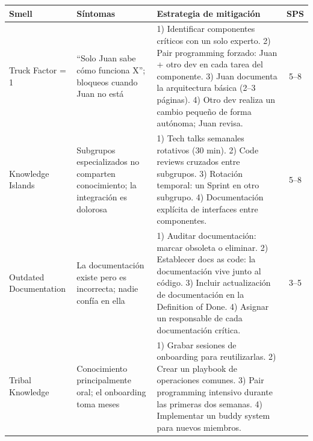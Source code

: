 \begin{table}[h]
    \centering
    \footnotesize
    \begin{tabularx}{\textwidth}{|l|X|X|c|}
        \hline
        \textbf{Smell} & \textbf{Síntomas}                                                              & \textbf{Estrategia de mitigación} & \textbf{SPS} \\
        \hline
        Truck Factor = 1
                       & “Solo Juan sabe cómo funciona X”; bloqueos cuando Juan no está
                       & 1) Identificar componentes críticos con un solo experto.
        2) Pair programming forzado: Juan + otro dev en cada tarea del componente.
        3) Juan documenta la arquitectura básica (2–3 páginas).
        4) Otro dev realiza un cambio pequeño de forma autónoma; Juan revisa.
                       & 5--8                                                                                                                              \\
        \hline
        Knowledge Islands
                       & Subgrupos especializados no comparten conocimiento; la integración es dolorosa
                       & 1) Tech talks semanales rotativos (30 min).
        2) Code reviews cruzados entre subgrupos.
        3) Rotación temporal: un Sprint en otro subgrupo.
        4) Documentación explícita de interfaces entre componentes.
                       & 5--8                                                                                                                              \\
        \hline
        Outdated Documentation
                       & La documentación existe pero es incorrecta; nadie confía en ella
                       & 1) Auditar documentación: marcar obsoleta o eliminar.
        2) Establecer docs as code: la documentación vive junto al código.
        3) Incluir actualización de documentación en la Definition of Done.
        4) Asignar un responsable de cada documentación crítica.
                       & 3--5                                                                                                                              \\
        \hline
        Tribal Knowledge
                       & Conocimiento principalmente oral; el onboarding toma meses
                       & 1) Grabar sesiones de onboarding para reutilizarlas.
        2) Crear un playbook de operaciones comunes.
        3) Pair programming intensivo durante las primeras dos semanas.
        4) Implementar un buddy system para nuevos miembros.

\end{tabularx}
\end{table}
